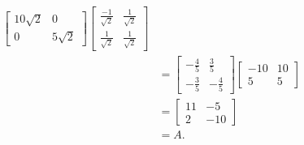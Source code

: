 \documentclass[12pt, letterpaper]{article}
\begin{document}
\begin{enumerate}
\begin{align*}
\begin{bmatrix}
10\sqrt{2} & 0 \\ 0 & 5\sqrt{2}
\end{bmatrix} \begin{bmatrix}
\frac{-1}{\sqrt{2}} & \frac{1}{\sqrt{2}}\\
\frac{1}{\sqrt{2}} & \frac{1}{\sqrt{2}}
\end{bmatrix}\\
&=\begin{bmatrix}
-\frac{4}{5} & \frac{3}{5}\\
-\frac{3}{5} & -\frac{4}{5}
\end{bmatrix} \begin{bmatrix}
-10 & 10 \\
 5 & 5 
\end{bmatrix}\\
&= \begin{bmatrix}
11 & -5 \\
 2 & -10 
\end{bmatrix}\\
&= A.
		\end{align*}
	\end{enumerate}
\end{document}
